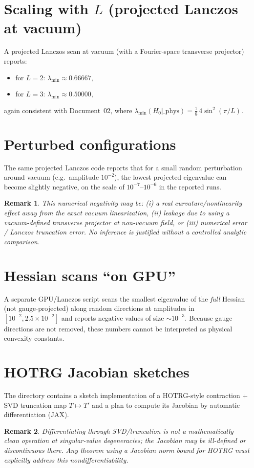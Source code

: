 \documentclass[11pt]{article}
\newtheorem{remark}{Remark}
\begin{document}
\section{Scaling with $L$ (projected Lanczos at vacuum)}

A projected Lanczos scan at vacuum (with a Fourier-space transverse projector) reports:
\begin{itemize}[leftmargin=*]
\item for $L=2$: $\lambda_{\min}\approx 0.66667$,
\item for $L=3$: $\lambda_{\min}\approx 0.50000$,
\end{itemize}
again consistent with Document~02, where $\lambda_{\min}(H_0|\_{\mathrm{phys}})=\frac{1}{6}\,4\sin^2(\pi/L)$.

\section{Perturbed configurations}

The same projected Lanczos code reports that for a small random perturbation around vacuum (e.g.\ amplitude $10^{-2}$), the lowest projected eigenvalue can become slightly negative, on the scale of $10^{-7}$--$10^{-6}$ in the reported runs.

\begin{remark}
This numerical negativity may be:
(i) a real curvature/nonlinearity effect away from the exact vacuum linearization,
(ii) leakage due to using a vacuum-defined transverse projector at non-vacuum field,
or (iii) numerical error / Lanczos truncation error.
No inference is justified without a controlled analytic comparison.
\end{remark}

\section{Hessian scans ``on GPU''}

A separate GPU/Lanczos script scans the smallest eigenvalue of the \emph{full} Hessian (not gauge-projected) along random directions at amplitudes in $[10^{-2}, 2.5\times 10^{-2}]$ and reports negative values of size $\sim 10^{-3}$.
Because gauge directions are not removed, these numbers cannot be interpreted as physical convexity constants.

\section{HOTRG Jacobian sketches}

The directory contains a sketch implementation of a HOTRG-style contraction + SVD truncation map $T\mapsto T'$ and a plan to compute its Jacobian by automatic differentiation (JAX).

\begin{remark}
Differentiating through SVD/truncation is not a mathematically clean operation at singular-value degeneracies; the Jacobian may be ill-defined or discontinuous there.
Any theorem using a Jacobian norm bound for HOTRG must explicitly address this nondifferentiability.
\end{remark}
\end{document}
